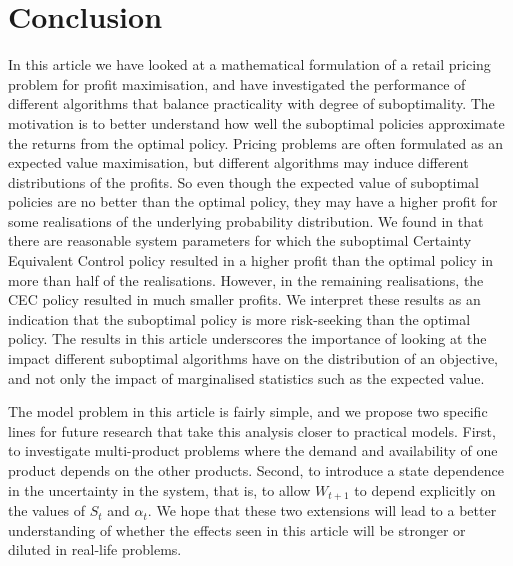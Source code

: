 \documentclass[main.tex]{subfiles}
\begin{document}
\listoftodos

\section{Conclusion}\label{sec:conclusion}
In this article we have looked at a mathematical formulation of a
retail pricing problem for profit maximisation, and have investigated the
performance of different algorithms that balance practicality
with degree of suboptimality. The motivation is to better understand
how well the suboptimal policies approximate the returns from the
optimal policy.
Pricing problems are often formulated as an expected value
maximisation, but different algorithms may induce different
distributions of the profits.
So even though the expected value of suboptimal policies are no better
than the optimal policy, they may have a higher profit for some
realisations of the underlying probability distribution.
We found in  that there are
reasonable system parameters for which
the suboptimal Certainty Equivalent Control policy resulted in a higher profit
than the optimal policy in more than half of the realisations.
However, in the remaining realisations, the CEC policy resulted in
much smaller profits. We interpret these results as an indication that
the suboptimal policy is more risk-seeking than the optimal policy.
The results in this article underscores the importance of looking at the impact
different suboptimal algorithms have on the distribution of
an objective, and not only the impact of
marginalised statistics such as the expected value.

The model problem in this article is fairly simple, and
we propose two specific lines for future research that
take this analysis closer to practical models.
First, to investigate multi-product problems where the demand and
availability of one product depends on the other products.
Second, to introduce a state dependence in the uncertainty in the
system, that is, to allow $W_{t+1}$ to depend explicitly on the values
of $S_t$ and $\alpha_t$.
We hope that these two extensions will lead to a better understanding of
whether the effects seen in this article will be stronger or diluted
in real-life problems.

\biblio
\end{document}
